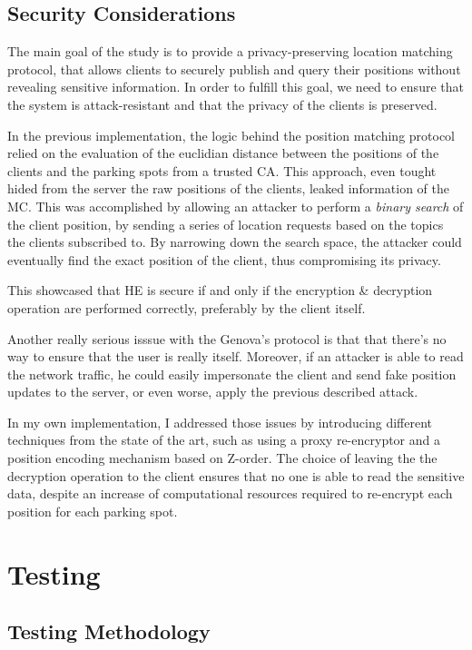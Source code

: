\documentclass[12pt,a4paper,twoside]{book}
\begin{document}
\section{Security Considerations}

The main goal of the study is to provide a privacy-preserving location matching protocol, that allows clients to securely publish and query their positions without revealing sensitive information. In order to fulfill this goal, we need to ensure that the system is attack-resistant and that the privacy of the clients is preserved.

In the previous implementation\cite{genova2024helamqtt}, the logic behind the position matching protocol relied on the evaluation of the euclidian distance between the positions of the clients and the parking spots from a trusted CA. This approach, even tought hided from the server the raw positions of the clients, leaked information of the MC. This was accomplished by allowing an attacker to perform a \emph{binary search} of the client position, by sending a series of location requests based on the topics the clients subscribed to. By narrowing down the search space, the attacker could eventually find the exact position of the client, thus compromising its privacy.

This showcased that HE is secure if and only if the encryption & decryption operation are performed correctly, preferably by the client itself.

Another really serious isssue with the Genova's protocol is that that there's no way to ensure that the user is really itself. Moreover, if an attacker is able to read the network traffic, he could easily impersonate the client and send fake position updates to the server, or even worse, apply the previous described attack.

In my own implementation, I addressed those issues by introducing different techniques from the state of the art, such as using a proxy re-encryptor and a position encoding mechanism based on Z-order. The choice of leaving the the decryption operation to the client ensures that no one is able to read the sensitive data, despite an increase of computational resources required to re-encrypt each position for each parking spot.

\chapter{Testing}
\section{Testing Methodology}
\end{document}
